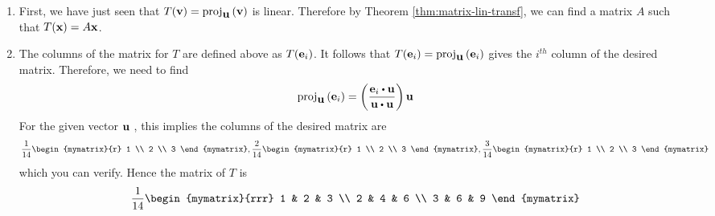 \begin{solution}
\begin{enumerate}
\item
First, we have just seen that $T (\mbox{\bf v}) = \mbox{\rm proj}_{\mbox{\bf u}}\left(\mbox{\bf v}\right)$ is linear. Therefore by Theorem \ref{thm:matrix-lin-transf}, we can find a matrix $A$ such that $T(\mbox{\bf x}) = A\mbox{\bf x}$. 

\item
The columns of the matrix for $T$ are defined above as $T(\mbox{\bf e}_{i})$. 
It follows that $T(\mbox{\bf e}_{i}) = \mbox{\rm proj}
_{\mbox{\bf u}}\left(\mbox{\bf e}_{i}\right) $ gives the $i^{th}$ column of the
desired matrix. Therefore, we need to find
\begin{equation*}
\func{proj}_{\vect{u}}\tup{\vect{e}_{i}} = \tup{\vspace{0.05in}
\frac{\vect{e}_{i}\dotprod \vect{u}}{\vect{u}\dotprod \vect{u}}}
\vect{u}
\end{equation*}
For the given vector $\mbox{\bf u}$ , this implies the columns of the desired
matrix are
\begin{equation*}
\vspace{0.05in}\frac{1}{14}\begin{mymatrix}{r}
1 \\
2 \\
3
\end{mymatrix} ,\vspace{0.05in}\frac{2}{14}\begin{mymatrix}{r}
1 \\
2 \\
3
\end{mymatrix} ,\vspace{0.05in}\frac{3}{14}\begin{mymatrix}{r}
1 \\
2 \\
3
\end{mymatrix} 
\end{equation*}
which you can verify.
Hence the matrix of $T$ is
\begin{equation*}
\vspace{0.05in}\frac{1}{14}\begin{mymatrix}{rrr}
1 & 2 & 3 \\
2 & 4 & 6 \\
3 & 6 & 9
\end{mymatrix} 
\end{equation*}
\end{enumerate}
\end{solution}
